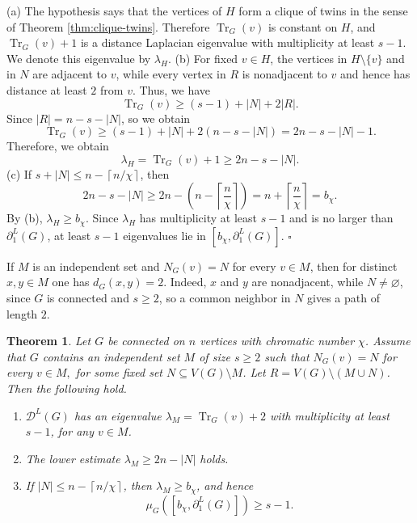 \documentclass[12pt]{article}
\newcommand{\DL}{\mathcal{D}^{L}}
\newcommand{\ceil}[1]{\left\lceil #1 \right\rceil}
\newcommand{\Tr}{\operatorname{Tr}}
\theoremstyle{plain}
\newtheorem{theorem}{Theorem}[section]
\theoremstyle{definition}
\renewenvironment{proof}{{\noindent\bfseries Proof. }}{\hfill$\square$\par}
\begin{document}
\begin{proof}
(a) The hypothesis says that the vertices of $H$ form a clique of twins in the sense of Theorem \ref{thm:clique-twins}.
Therefore $\Tr_G(v)$ is constant on $H$, and $\Tr_G(v)+1$ is a distance Laplacian eigenvalue with multiplicity at least $s-1$.
We denote this eigenvalue by $\lambda_H$. (b) For fixed $v\in H$, the vertices in $H\setminus\{v\}$ and in $N$ are adjacent to $v$, while every vertex in $R$ is nonadjacent to
$v$ and hence has distance at least $2$ from $v$. Thus, we have
\[
\Tr_G(v)
\ge (s-1)+|N|+2|R|.
\]
Since $|R|=n-s-|N|$, so we obtain
\[
\Tr_G(v)\ge (s-1)+|N|+2(n-s-|N|)=2n-s-|N|-1.
\]
Therefore, we obtain
\[
\lambda_H=\Tr_G(v)+1\ge 2n-s-|N|.
\]
 (c) If $s+|N|\le n-\ceil{n/\chi}$, then
\[
2n-s-|N|
\ge 2n-\left(n-\ceil{\frac{n}{\chi}}\right)
=n+\ceil{\frac{n}{\chi}}=b_\chi.
\]
By (b), $\lambda_H\ge b_\chi$. Since $\lambda_H$ has multiplicity at least $s-1$ and is no larger than
$\partial_1^L(G)$, at least $s-1$ eigenvalues lie in $[b_\chi,\partial_1^L(G)]$.
\end{proof}

\medskip
\noindent  If $M$ is an independent set and $N_G(v)=N$ for every $v\in M$, then for distinct $x,y\in M$ one has $d_G(x,y)=2$. Indeed,
$x$ and $y$ are nonadjacent, while $N\neq\varnothing$, since $G$ is connected and $s\ge2$, so a common neighbor in $N$ gives a
path of length $2$.

\begin{theorem}\label{thm:indep-refine}
Let $G$ be connected on $n$ vertices with chromatic number $\chi$. Assume that $G$ contains an independent set $M$ of size
$s\ge2$ such that $N_G(v)=N$ for every $v\in M,$ for some fixed set $N\subseteq V(G)\setminus M$. Let $R=V(G)\setminus(M\cup N)$. Then the following hold.
\begin{enumerate}[label=\textup{(\alph*)},noitemsep]
    \item $\DL(G)$ has an eigenvalue $\lambda_M=\Tr_G(v)+2$ with multiplicity at least $s-1$, for any $v\in M$.
    \item The lower estimate $\lambda_M\ge 2n-|N|$ holds.
    \item If $|N|\le n-\ceil{n/\chi}$, then $\lambda_M\ge b_\chi$, and hence
    \[
        \mu_G([b_\chi,\partial_1^L(G)])\ge s-1.
    \]
\end{enumerate}
\end{theorem}
\end{document}
